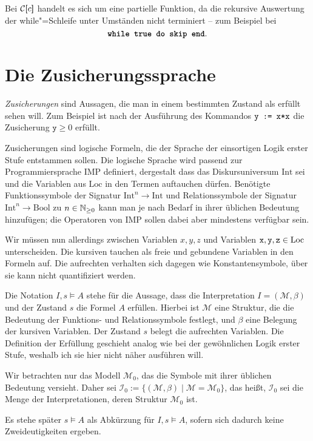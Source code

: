 Bei $\mathcal C[\hspace{-2.6pt}[c]\hspace{-2.4pt}]$ handelt es sich um eine partielle Funktion, da die rekursive Auswertung
der while"=Schleife unter Umständen nicht terminiert -- zum Beispiel bei
\[\texttt{\kw{while} \kw{true} \kw{do} \kw{skip} \kw{end}}.\]

\section{Die Zusicherungssprache}

\emph{Zusicherungen} sind Aussagen, die man in einem bestimmten Zustand als
erfüllt sehen will. Zum Beispiel ist nach der Ausführung des Kommandos
$\texttt{y := x*x}$ die Zusicherung $\texttt{y}\ge 0$
erfüllt.

Zusicherungen sind logische Formeln, die der Sprache der einsortigen Logik
erster Stufe entstammen sollen. Die logische Sprache wird passend zur
Programmiersprache IMP definiert, dergestalt dass das Diskursuniversum
$\mathrm{Int}$ sei und die Variablen aus $\mathrm{Loc}$ in den Termen auftauchen dürfen.
Benötigte Funktionssymbole der Signatur $\mathrm{Int}^n\to\mathrm{Int}$ und
Relationssymbole der Signatur $\mathrm{Int}^n\to\mathrm{Bool}$ zu $n\in\mathbb N_{\ge 0}$
kann man je nach Bedarf in ihrer üblichen Bedeutung hinzufügen; die Operatoren
von IMP sollen dabei aber mindestens verfügbar sein.

Wir müssen nun allerdings zwischen Variablen $x,y,z$ und Variablen
$\texttt{x},\texttt{y},\texttt{z}\in\mathrm{Loc}$ unterscheiden. Die kursiven tauchen
als freie und gebundene Variablen in den Formeln auf. Die aufrechten
verhalten sich dagegen wie Konstantensymbole, über sie kann nicht
quantifiziert werden.

Die Notation $I,s\models A$ stehe für die Aussage, dass
die Interpretation $I=(\mathcal M,\beta)$ und der Zustand $s$
die Formel $A$ erfüllen. Hierbei ist $\mathcal M$ eine Struktur, die
die Bedeutung der Funktions- und Relationssymbole festlegt,
und $\beta$ eine Belegung der kursiven Variablen. Der Zustand $s$
belegt die aufrechten Variablen. Die Definition der Erfüllung geschieht
analog wie bei der gewöhnlichen Logik erster Stufe, weshalb ich sie hier
nicht näher ausführen will.

Wir betrachten nur das Modell $\mathcal M_0$, das die Symbole mit ihrer üblichen
Bedeutung versieht. Daher sei $\mathcal I_0:=\{(\mathcal M,\beta)\mid\mathcal M=\mathcal M_0\}$,
das heißt, $\mathcal I_0$ sei die Menge der Interpretationen, deren Struktur
$\mathcal M_0$ ist.

Es stehe später $s\models A$ als Abkürzung für $I,s\models A$,
sofern sich dadurch keine Zweideutigkeiten ergeben.

